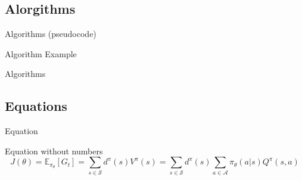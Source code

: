 \documentclass{libs/XJTLU_format}
\begin{document}
\subsection{Alorgithms}
\begin{frame}{Algorithms (pseudocode)}
    \begin{algorithm}[H]
        \SetAlgoLined
        \LinesNumbered
         \caption{Algorithm Example}
    \end{algorithm}
\end{frame}

\begin{frame}{Algorithms}
    \lstset{language=Python}
    
\end{frame}

\subsection{Equations}

\begin{frame}{Equation}
    \begin{block}{Equation without numbers} 
        \begin{equation*}
            J(\theta) = \mathbb{E}_{\pi_\theta}[G_t] = \sum_{s\in\mathcal{S}} d^\pi (s)V^\pi(s)=\sum_{s\in\mathcal{S}} d^\pi(s)\sum_{a\in\mathcal{A}}\pi_\theta(a|s)Q^\pi(s,a)
        \end{equation*}
    \end{block}
%       
\end{frame}
\end{document}
